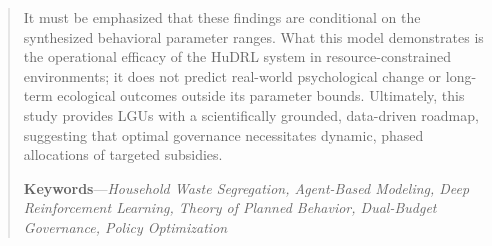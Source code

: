 \begin{abstract}
It must be emphasized that these findings are conditional on the synthesized behavioral parameter ranges. What this model demonstrates is the operational efficacy of the HuDRL system in resource-constrained environments; it does not predict real-world psychological change or long-term ecological outcomes outside its parameter bounds. Ultimately, this study provides LGUs with a scientifically grounded, data-driven roadmap, suggesting that optimal governance necessitates dynamic, phased allocations of targeted subsidies.
\vspace{1cm} 

\noindent \textbf{Keywords}---\textit{Household Waste Segregation, Agent-Based Modeling, Deep Reinforcement Learning, Theory of Planned Behavior, Dual-Budget Governance, Policy Optimization}

\end{abstract}